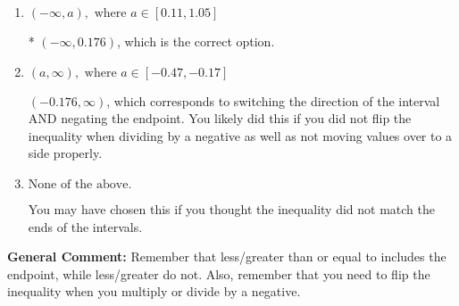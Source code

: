 \documentclass{extbook}[14pt]
\begin{document}
\begin{enumerate}
{\begin{enumerate}[label=\Alph*.]
 $(-\infty, -0.176)$, which corresponds to negating the endpoint of the solution.
\item \( (-\infty, a), \text{ where } a \in [0.11, 1.05] \)

* $(-\infty, 0.176)$, which is the correct option.
\item \( (a, \infty), \text{ where } a \in [-0.47, -0.17] \)

 $(-0.176, \infty)$, which corresponds to switching the direction of the interval AND negating the endpoint. You likely did this if you did not flip the inequality when dividing by a negative as well as not moving values over to a side properly.
\item \( \text{None of the above}. \)

You may have chosen this if you thought the inequality did not match the ends of the intervals.
\end{enumerate}

\textbf{General Comment:} Remember that less/greater than or equal to includes the endpoint, while less/greater do not. Also, remember that you need to flip the inequality when you multiply or divide by a negative.
}
\end{enumerate}
\end{document}
